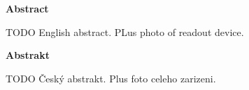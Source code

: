 \thispagestyle{plain}

\begin{center}
	\Large
	\textbf{Abstract}
\end{center}

TODO English abstract. PLus photo of readout device.



\hfill

\begin{center}
	\Large
	\textbf{Abstrakt}
\end{center}

TODO Český abstrakt. Plus foto celeho zarizeni.